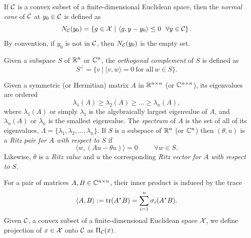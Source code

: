 If ${\mathcal C}$ is a convex subset of a finite-dimensional Euclidean space, then the \textit{normal cone} of ${\mathcal C}$ at $y_0 \in {\mathcal C}$ is defined as
\begin{equation} 			\label{Def:normal_cone}
N_{\mathcal C}(y_0) = \left\{ g \in {\mathcal X} \ | \ \langle g, y - y_0 \rangle \leq 0 \ \ \forall y \in {\mathcal C} \right\}.
\end{equation}
By convention, if $y_0$ is not in ${\mathcal C}$, then $N_{\mathcal C}(y_0)$ is the empty set.

Given a subspace $S$ of ${\mathbb R}^n$ or ${\mathbb C}^n$, the \textit{orthogonal complement} of $S$ is defined as
\begin{equation}
S^\perp = \{ v \ | \ \langle v, w \rangle = 0 \ \text{for all} \ w \in S \}.
\end{equation}


Given a symmetric (or Hermitian) matrix $A$ in ${\mathbb R}^{n \times n}$ (or ${\mathbb C}^{n \times n}$), its eigenvalues are ordered
\begin{equation}			\label{Def:eigenvalues}
\lambda_1(A) \geq \lambda_2(A) \geq \ldots \geq \lambda_n(A),
\end{equation}
where $\lambda_1(A)$ or simply $\lambda_1$ is the algebraically largest eigenvalue of $A$, and $\lambda_n(A)$ or $\lambda_n$ is the smallest eigenvalue.  The \textit{spectrum} of $A$ is the set of all of its eigenvalues, $\Lambda = \{ \lambda_1, \lambda_2, \ldots, \lambda_n\}$.
If $S$ is a subspace of ${\mathbb R}^n$ (or ${\mathbb C}^n$) then $(\theta, u)$ is a \textit{Ritz pair for $A$ with respect to $S$} if 
\begin{equation} 			\label{Def:Ritz_pair_val_vec}
\langle w, (Au-\theta u) \rangle = 0 \hspace{1cm} \forall w \in S.
\end{equation}
Likewise, $\theta$ is a \textit{Ritz value} and $u$ the corresponding \textit{Ritz vector for $A$ with respect to $S$}.

For a pair of matrices $A, B \in {\mathbb C}^{n \times n}$, their inner product is induced by the trace
\begin{equation}			\label{Def:trace_inner_product}
\langle A, B \rangle := \mathrm{tr}(A^*B) = \sum_{i=1}^n \sigma_i(A^*B).
\end{equation}
Given ${\mathcal C}$, a convex subset of a finite-dimensional Euclidean space ${\mathcal X}$, we define projection of $x \in {\mathcal X}$ onto ${\mathcal C}$ as $\Pi_{\mathcal C}(x)$.  



